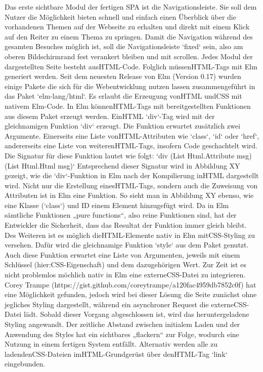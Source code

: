 \iffalse
Das erste sichtbare Modul der fertigen SPA ist die Navigationsleiste. Sie soll dem Nutzer die Möglichkeit bieten schnell und einfach einen Überblick über die vorhandenen Themen auf der Webseite zu erhalten und direkt mit einem Klick auf den Reiter zu einem Thema zu springen. Damit die Navigation während des gesamten Besuches möglich ist, soll die Navigationsleiste `fixed` sein, also am oberen Bildschirmrand fest verankert bleiben und mit scrollen.
Jedes Modul der dargestellten Seite besteht aus\ac{HTML}-Code. Folglich müssen\ac{HTML}-Tags mit Elm generiert werden. Seit dem neuesten Release von Elm (Version 0.17) wurden einige Pakete die sich für die Webentwicklung nutzen lassen zusammengeführt in das Paket `elm-lang/html`. Es erlaubt die Erzeugung von\ac{HTML} und\ac{CSS} mit nativem Elm-Code. In Elm können\ac{HTML}-Tags mit bereitgestellten Funktionen aus diesem Paket erzeugt werden. Ein\ac{HTML} `div`-Tag wird mit der gleichnamigen Funktion `div` erzeugt. Die Funktion erwartet zusätzlich zwei Argumente. Einerseits eine Liste von\ac{HTML}-Attributen wie `class`, `id` oder `href`, andererseits eine Liste von weiteren\ac{HTML}-Tags, insofern Code geschachtelt wird. Die Signatur für diese Funktion lautet wie folgt:
`div (List Html.Attribute msg) (List Html.Html msg)`
Entsprechend dieser Signatur wird in Abbildung XY gezeigt, wie die `div`-Funktion in Elm nach der Kompilierung in\ac{HTML} dargestellt wird.
Nicht nur die Erstellung eines\ac{HTML}-Tags, sondern auch die Zuweisung von Attributen ist in Elm eine Funktion. So sieht man in Abbildung XY ebenso, wie eine Klasse (`class`) und ID einem Element hinzugefügt wird. Da in Elm sämtliche Funktionen „pure functions“, also reine Funktionen sind, hat der Entwickler die Sicherheit, dass das Resultat der Funktion immer gleich bleibt.
Des Weiteren ist es möglich die\ac{HTML}-Elemente nativ in Elm mit\ac{CSS}-Styling zu versehen. Dafür wird die gleichnamige Funktion `style` aus dem Paket genutzt. Auch diese Funktion erwartet eine Liste von Argumenten, jeweils mit einem Schlüssel (hier:\ac{CSS}-Eigenschaft) und dem dazugehörigen Wert. Zur Zeit ist es nicht problemlos möchlich nativ in Elm eine externe\ac{CSS}-Datei zu integrieren. Corey Trampe (https://gist.github.com/coreytrampe/a120fac4959db7852c0f) hat eine Möglichkeit gefunden, jedoch wird bei dieser Lösung die Seite zunächst ohne jegliches Styling dargestellt, während ein asynchroner Request die externe\ac{CSS}-Datei lädt. Sobald dieser Vorgang abgeschlossen ist, wird das heruntergeladene Styling angewandt. Der zeitliche Abstand zwischen initialem Laden und der Anwendung des Styles hat ein sichtbares „flackern“ zur Folge, wodurch eine Nutzung in einem fertigen System entfällt. Alternativ werden alle zu ladenden\ac{CSS}-Dateien im\ac{HTML}-Grundgerüst über den\ac{HTML}-Tag `link` eingebunden.


